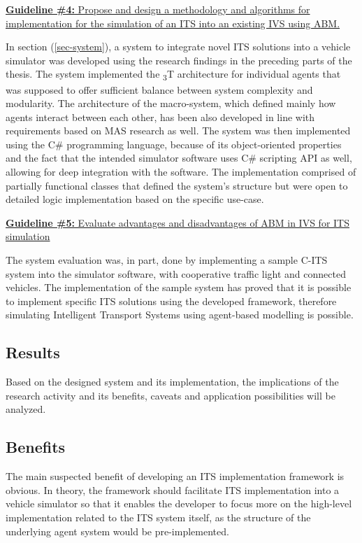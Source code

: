 \documentclass[main.tex]{subfiles}
\begin{document}
\ul{\textbf{Guideline \#4:} Propose and design a methodology and algorithms for implementation for the 
simulation of an ITS into an existing IVS using ABM.}

In section (\ref{sec-system}), a system to integrate novel ITS solutions into a vehicle simulator was developed using the research findings in the 
preceding parts of the thesis. The system implemented the \textsubscript{3}T architecture for individual agents that was supposed 
to offer sufficient balance between system complexity and modularity. The architecture of the macro-system, which defined mainly 
how agents interact between each other, has been also developed in line with requirements based on MAS research as well. The 
system was then implemented using the C\# programming language, because of its object-oriented properties and the fact that 
the intended simulator software uses C\# scripting API as well, allowing for deep integration with the software. The implementation comprised of partially functional classes that 
defined the system's structure but were open to detailed logic implementation based on the specific use-case. 

\ul{\textbf{Guideline \#5:} Evaluate advantages and disadvantages of ABM in IVS for ITS simulation}

The system evaluation was, in part, done by implementing a sample C-ITS system into the simulator software, with cooperative 
traffic light and connected vehicles. The implementation of the sample system has proved that it is possible to implement specific 
ITS solutions using the developed framework, therefore simulating Intelligent Transport Systems using agent-based modelling is 
possible.

\subsection{Results}

Based on the designed system and its implementation, the implications of the research activity and its benefits, caveats and application 
possibilities will be analyzed. 

\subsection{Benefits}

The main suspected benefit of developing an ITS implementation framework is obvious. In theory, the framework should facilitate 
ITS implementation into a vehicle simulator so that it enables the developer to focus more on the high-level implementation related 
to the ITS system itself, as the structure of the underlying agent system would be pre-implemented. 
\end{document}
